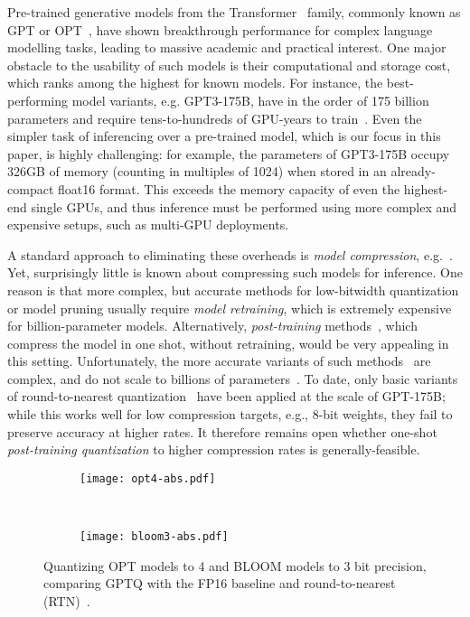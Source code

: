 Pre-trained generative models from the Transformer~\cite{vaswani2017attention} family, commonly known as GPT or OPT~\cite{radford2019language, brown2020language, zhang2022opt}, have shown breakthrough performance for complex language modelling tasks, leading to massive academic and practical interest. One major obstacle to the usability of such models is their computational and storage cost, which ranks among the highest for known models. For instance, the best-performing model variants, e.g. GPT3-175B, have in the order of 175 billion parameters and require tens-to-hundreds of GPU-years to train~\cite{zhang2022opt}. Even the simpler task of inferencing over a pre-trained model, which is our focus in this paper, is highly challenging: for example, the parameters of GPT3-175B occupy 326GB of memory (counting in multiples of 1024) when stored in an already-compact float16 format. This exceeds the memory capacity of even the highest-end single GPUs, and thus inference must be performed using more complex and expensive setups, such as multi-GPU deployments. 

A standard approach to eliminating these overheads is \emph{model compression}, e.g.~\cite{hoefler2021sparsity, gholami2021survey}. Yet, surprisingly little is known about compressing such models for inference. 
One reason is that more complex, but accurate methods for low-bitwidth quantization or model pruning usually require \emph{model retraining}, which is extremely expensive for billion-parameter models. 
Alternatively, \emph{post-training} methods~\cite{nagel2020up, wang2020towards, hubara2020improving, nahshan2021loss}, which compress the model in one shot, without retraining, would be very appealing in this setting. 
Unfortunately, the more accurate variants of such methods~\cite{li2021brecq,hubara2021accurate,frantar2022obc} are complex, and do not scale to billions of parameters~\cite{yao2022zeroquant}. 
To date, only basic variants of round-to-nearest quantization~\cite{yao2022zeroquant, dettmers2022llm} have been applied at the scale of GPT-175B; while this works well for low compression targets, e.g., 8-bit weights, they fail to preserve accuracy at higher rates. It therefore remains open whether one-shot \emph{post-training quantization} to higher compression rates is generally-feasible. 

\begin{figure}[h]
    \centering
    \begin{subfigure}{0.45\linewidth}
        \centering
        \texttt{[image: opt4-abs.pdf]}
    \end{subfigure}~~~~~
    \begin{subfigure}{0.45\linewidth}
        \centering
        \texttt{[image: bloom3-abs.pdf]}
    \end{subfigure}
    \caption{Quantizing OPT models to 4 and BLOOM models to 3 bit precision, comparing GPTQ with the FP16 baseline and round-to-nearest (RTN)~\cite{yao2022zeroquant, dettmers2022llm}.\vspace{-1.5em}}
    \label{fig:intro-comparison}
\end{figure}
\vspace{10pt}

